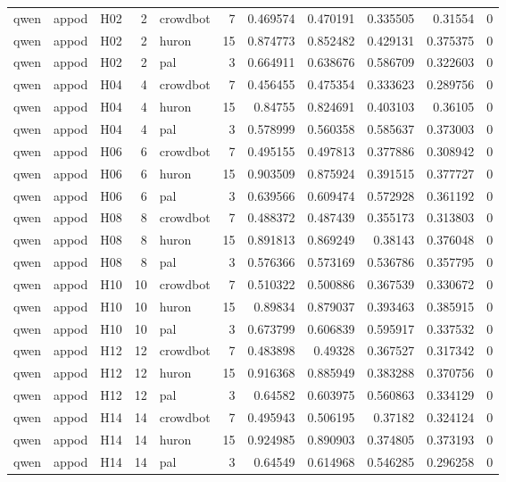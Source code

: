 \begin{longtable}{lllrlrrrrrr}
qwen & appod & H02 & 2 & crowdbot & 7 & 0.469574 & 0.470191 & 0.335505 & 0.31554 & 0 \\
qwen & appod & H02 & 2 & huron & 15 & 0.874773 & 0.852482 & 0.429131 & 0.375375 & 0 \\
qwen & appod & H02 & 2 & pal & 3 & 0.664911 & 0.638676 & 0.586709 & 0.322603 & 0 \\
qwen & appod & H04 & 4 & crowdbot & 7 & 0.456455 & 0.475354 & 0.333623 & 0.289756 & 0 \\
qwen & appod & H04 & 4 & huron & 15 & 0.84755 & 0.824691 & 0.403103 & 0.36105 & 0 \\
qwen & appod & H04 & 4 & pal & 3 & 0.578999 & 0.560358 & 0.585637 & 0.373003 & 0 \\
qwen & appod & H06 & 6 & crowdbot & 7 & 0.495155 & 0.497813 & 0.377886 & 0.308942 & 0 \\
qwen & appod & H06 & 6 & huron & 15 & 0.903509 & 0.875924 & 0.391515 & 0.377727 & 0 \\
qwen & appod & H06 & 6 & pal & 3 & 0.639566 & 0.609474 & 0.572928 & 0.361192 & 0 \\
qwen & appod & H08 & 8 & crowdbot & 7 & 0.488372 & 0.487439 & 0.355173 & 0.313803 & 0 \\
qwen & appod & H08 & 8 & huron & 15 & 0.891813 & 0.869249 & 0.38143 & 0.376048 & 0 \\
qwen & appod & H08 & 8 & pal & 3 & 0.576366 & 0.573169 & 0.536786 & 0.357795 & 0 \\
qwen & appod & H10 & 10 & crowdbot & 7 & 0.510322 & 0.500886 & 0.367539 & 0.330672 & 0 \\
qwen & appod & H10 & 10 & huron & 15 & 0.89834 & 0.879037 & 0.393463 & 0.385915 & 0 \\
qwen & appod & H10 & 10 & pal & 3 & 0.673799 & 0.606839 & 0.595917 & 0.337532 & 0 \\
qwen & appod & H12 & 12 & crowdbot & 7 & 0.483898 & 0.49328 & 0.367527 & 0.317342 & 0 \\
qwen & appod & H12 & 12 & huron & 15 & 0.916368 & 0.885949 & 0.383288 & 0.370756 & 0 \\
qwen & appod & H12 & 12 & pal & 3 & 0.64582 & 0.603975 & 0.560863 & 0.334129 & 0 \\
qwen & appod & H14 & 14 & crowdbot & 7 & 0.495943 & 0.506195 & 0.37182 & 0.324124 & 0 \\
qwen & appod & H14 & 14 & huron & 15 & 0.924985 & 0.890903 & 0.374805 & 0.373193 & 0 \\
qwen & appod & H14 & 14 & pal & 3 & 0.64549 & 0.614968 & 0.546285 & 0.296258 & 0 \\

\end{longtable}
